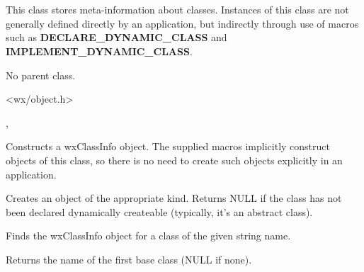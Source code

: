 \section{}\label{wxclassinfo}

This class stores meta-information about classes. Instances of this class are
not generally defined directly by an application, but indirectly through use
of macros such as {\bf DECLARE\_DYNAMIC\_CLASS} and {\bf IMPLEMENT\_DYNAMIC\_CLASS}.


No parent class.


<wx/object.h>


, 


\label{wxclassinfoconstr}


Constructs a wxClassInfo object. The supplied macros implicitly construct objects of this
class, so there is no need to create such objects explicitly in an application.



Creates an object of the appropriate kind. Returns NULL if the class has not been declared
dynamically createable (typically, it's an abstract class).



Finds the wxClassInfo object for a class of the given string name.



Returns the name of the first base class (NULL if none).



